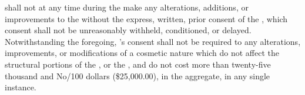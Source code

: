 \lessee shall not at any time during the \termOfLease make any alterations, additions, or improvements to the \premises without the express, written, prior consent of the \lessor, which consent shall not be unreasonably withheld, conditioned, or delayed. Notwithstanding the foregoing, \lessor's consent shall not be required to any alterations, improvements, or modifications of a cosmetic nature which do not affect the structural portions of the \premises, or the \building, and do not cost more than twenty-five thousand and No/100 dollars (\$25,000.00), in the aggregate, in any single instance.
